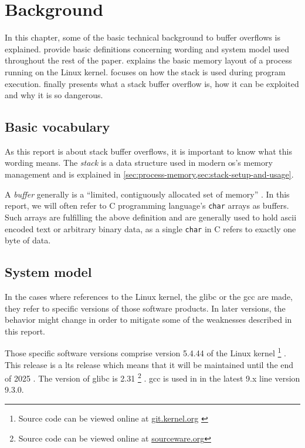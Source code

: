 \chapter{Background}
\label{chp:background}

In this chapter, some of the basic technical background to buffer overflows is explained.
 provide basic definitions concerning wording and system model used throughout the rest of the paper.
 explains the basic memory layout of a process running on the Linux kernel.
 focuses on how the stack is used during program execution.
 finally presents what a stack buffer overflow is, how it can be exploited and why it is so dangerous.

\section{Basic vocabulary}
\label{sec:basic-vocabulary}
As this report is about stack buffer overflows, it is important to know what this wording means.
The \emph{stack} is a data structure used in modern \acs{os}'s memory management and is explained in \cref{sec:process-memory,sec:stack-setup-and-usage}.

A \emph{buffer} generally is a ``limited, contiguously allocated set of memory'' \cite[12]{Anley2007}.
In this report, we will often refer to C programming language's \texttt{char} arrays as buffers.
Such arrays are fulfilling the above definition and are generally used to hold \gls{ascii} encoded text or arbitrary binary data, as a single \texttt{char} in C refers to exactly one byte of data.

\section{System model}
\label{sec:system-model}

In the cases where references to the Linux kernel, the \gls{glibc} or the \gls{gcc} are made, they refer to specific versions of those software products.
In later versions, the behavior might change in order to mitigate some of the weaknesses described in this report.

Those specific software versions comprise version 5.4.44 of the Linux kernel%
\footnote{Source code can be viewed online at \href{https://git.kernel.org/stable/h/v5.4.44}{git.kernel.org} \cite{LKD2020}}%
.
This release is a \gls{lts} release which means that it will be maintained until the end of 2025 \cite{LKO2020}.
The version of \gls{glibc} is 2.31%
\footnote{Source code can be viewed online at \href{https://sourceware.org/git/?p=glibc.git;a=tree;h=6ee690ef6fa36bf79d2e05b5a30a4f7e10ba3937;hb=9ea3686266dca3f004ba874745a4087a89682617}{sourceware.org}}%
.
\gls{gcc} is used in in the latest 9.x line version 9.3.0.

